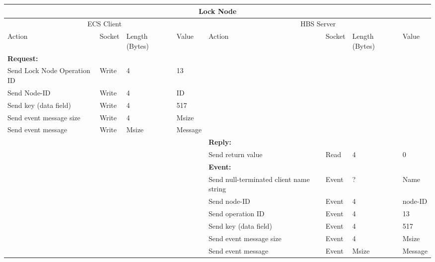 \bigskip
\small
\begin{tabular}{|p{1.2in}|p{.4in}|p{.4in}|p{.5in}|p{1.2in}|p{.4in}|p{.4in}|p{.5in} |} \hline
\multicolumn{8}{|c|}{{\bf Lock Node}} \\ \hline
\multicolumn{4}{|c|}{ECS Client} & \multicolumn{4}{|c|}{HBS Server} \\ \hline
Action            & Socket & Length  
                            (Bytes)& Value & Action       & Socket & Length 
                                                                    (Bytes)& Value \\ \hline
\multicolumn{4}{|l}{{\bf Request:}}&\multicolumn{4}{|l|}{~} \\ \hline
Send Lock Node Operation ID  & Write  & 4     & 13     &              &        &       &       \\ \hline
Send Node-ID      & Write  & 4     &  ID &           &        &       &       \\ \hline
Send key (data field)    & Write  & 4     & 517   &              &        &       &       \\ \hline
Send event
message size      & Write  & 4     &  Msize &         &        &       &       \\ \hline
Send event message
                  & Write  &  Msize  &  Message &     &        &       &       \\ \hline
\multicolumn{4}{|l}{~}&\multicolumn{4}{|l|}{{\bf Reply:}} \\ \hline
                  &        &       &       & Send return
                                             value        & Read   &  4    & 0       \\ \hline
\multicolumn{4}{|l}{~}&\multicolumn{4}{|l|}{{\bf Event:}} \\ \hline
                  &        &       &       & Send null-terminated client
                                             name string  & Event  &  ?    & Name  \\ \hline
                  &        &       &       & Send node-ID  & Event  &   4   &   node-ID    \\  \hline
                  &        &       &       & Send operation 
                                             ID           & Event  &   4   &  13   \\ \hline
                  &        &       &       & Send key (data field)    & Event  &   4   &  517    \\ \hline
                  &        &       &       & Send event message
                                                  size    & Event  &   4   &  Msize \\ \hline
                  &        &       &       & Send event message
                                                          & Event  & Msize& Message  \\ \hline
\end{tabular}
\normalsize
\bigskip



